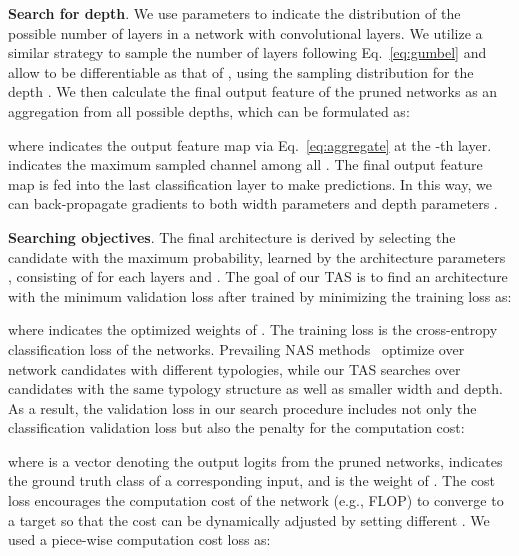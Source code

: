 \documentclass{article}
\def\Eqref#1{Eq.~\eqref{#1}}
\def\NAME{{TAS}}
\begin{document}
\textbf{Search for depth}. We use parameters  to indicate the distribution of the possible number of layers in a network with  convolutional layers.
We utilize a similar strategy to sample the number of layers following \Eqref{eq:gumbel} and allow  to be differentiable as that of , using the sampling distribution  for the depth .
We then calculate the final output feature of the pruned networks as an aggregation from all possible depths, which can be formulated as:

where  indicates the output feature map via \Eqref{eq:aggregate} at the -th layer.  indicates the maximum sampled channel among all .
The final output feature map  is fed into the last classification layer to make predictions. In this way, we can back-propagate gradients to both width parameters  and depth parameters .





\textbf{Searching objectives}.
The final architecture  is derived by selecting the candidate with the maximum probability, learned by the architecture parameters , consisting of  for each layers and .
The goal of our {\NAME} is to find an architecture  with the minimum validation loss  after trained by minimizing the training loss  as:

where  indicates the optimized weights of . The training loss is the cross-entropy classification loss of the networks.
Prevailing NAS methods~\cite{liu2019darts,zoph2017neural,dong2019search,cai2018proxylessnas,real2019regularized} optimize  over network candidates with different typologies, while our {\NAME} searches over candidates with the same typology structure as well as smaller width and depth. As a result, the validation loss in our search procedure includes not only the classification validation loss but also the penalty for the computation cost:

where  is a vector denoting the output logits from the pruned networks,
 indicates the ground truth class of a corresponding input,
and  is the weight of .
The cost loss encourages the computation cost of the network (e.g., FLOP) to converge to a target  so that the cost can be dynamically adjusted by setting different .
We used a piece-wise computation cost loss as:
 
\end{document}
